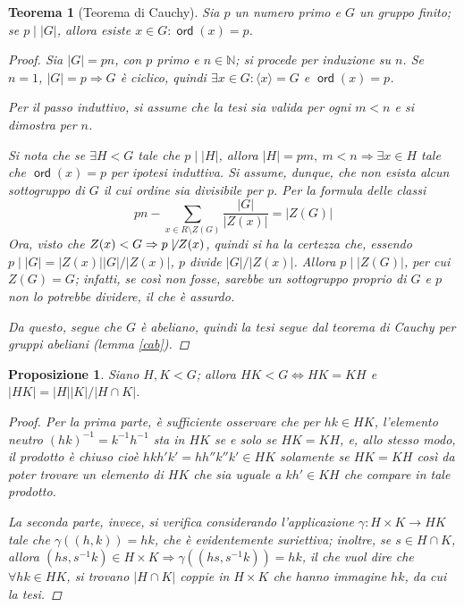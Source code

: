 \documentclass[11pt]{scrartcl}
\theoremstyle{style1}
\newtheorem{teorema}{Teorema}[section]
\newtheorem{prop}{Proposizione}[section]
\numberwithin{equation}{subsection}
\renewcommand{\operatorname}[1]{\mathop{\mathrm{\textsf{#1}}}}
\begin{document}
\begin{teorema}
	[Teorema di Cauchy]
	Sia $p$ un numero primo e $G$ un gruppo finito; se $p  \mid |G|$, allora esiste $x \in G : \operatorname{ord}(x) = p $.
	\begin{proof}
		Sia $|G| = pn$, con $p$ primo e $n \in \mathbb{N}$; si procede per induzione su $n$.
		Se $n=1$, $|G| = p \Rightarrow G$ \`e ciclico, quindi $\exists x \in G : \langle x \rangle=G$ e $\operatorname{ord}(x) = p$.

		Per il passo induttivo, si assume che la tesi sia valida per ogni $ m < n$ e si dimostra per $n$.

Si nota che se $\exists  H < G$ tale che $p  \mid  \lvert H \rvert $, allora $|H|=pm , \ m < n \Rightarrow \exists x \in H$ tale che $\operatorname{ord}(x) =p$ per ipotesi induttiva.
Si assume, dunque, che non esista alcun sottogruppo di $G$ il cui ordine sia divisibile per $p$.
Per la formula delle classi
\[
pn - \sum_{x \in R\setminus Z(G)}^{} \frac{\lvert G \rvert }{|Z(x)|} = \lvert Z(G) \rvert 
\] 
Ora, visto che $Z(x) < G \Rightarrow p \not  \mid Z(x)$, quindi si ha la certezza che, essendo $p  \mid |G| = |Z(x)| |G|/|Z(x)|$, $p$ divide $|G|/|Z(x)|$. 
Allora $p  \mid  |Z(G)|$, per cui $Z(G) =G$; infatti, se cos\`i non fosse, sarebbe un sottogruppo proprio di $G$ e $p$ non lo potrebbe dividere, il che \`e assurdo.

Da questo, segue che $G$ \`e abeliano, quindi la tesi segue dal teorema di Cauchy per gruppi abeliani (lemma \ref{cab}).
	\end{proof}
\end{teorema}
\begin{prop}\label{tgen}
Siano $H,K < G$; allora $HK < G \iff HK = KH$ e $\lvert HK \rvert = \lvert H \rvert \lvert K \rvert / \lvert H \cap K \rvert $.
\begin{proof}
Per la prima parte, \`e sufficiente osservare che per $hk \in HK$, l'elemento neutro $(hk)^{-1} = k^{-1} h^{-1} $ sta in $HK$ se e solo se $HK = KH$, e, allo stesso modo, il prodotto \`e chiuso cio\`e $hkh'k' = hh''k''k' \in HK$ solamente se $HK = KH$ cos\`i da poter trovare un elemento di $HK$ che sia uguale a $kh'\in KH$ che compare in tale prodotto.

La seconda parte, invece, si verifica considerando l'applicazione $\gamma: H \times K\to HK$ tale che $\gamma((h,k)) = hk$, che \`e evidentemente suriettiva; inoltre, se $s \in H \cap K$, allora $(hs,s^{-1}k) \in H \times K\Rightarrow \gamma ((hs,s^{-1}k)) = hk$, il che vuol dire che $\forall hk \in HK$, si trovano $|H\cap K|$ coppie in $H \times K$ che hanno immagine $hk$, da cui la tesi.
\end{proof}
\end{prop}
\end{document}
